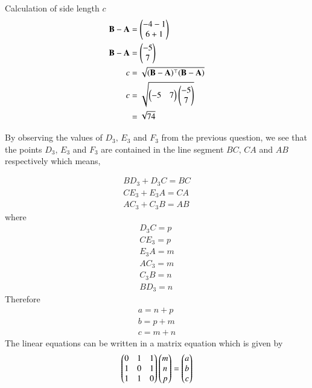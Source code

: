 \documentclass[journal,12pt,twocolumn]{IEEEtran}
\theoremstyle{remark}
\begin{document}
\vspace{0.3cm}
Calculation of side length $c$
\begin{align}
\mathbf{B}-\mathbf{A} &= \begin{pmatrix}-4-1\\6+1\end{pmatrix}\\
\mathbf{B}-\mathbf{A} &= \begin{pmatrix}-5\\7\end{pmatrix}\\
c &= \sqrt{(\mathbf{B}-\mathbf{A})^{\top}(\mathbf{B}-\mathbf{A})}\\
c &= \sqrt{\begin{pmatrix}-5&7\end{pmatrix}\begin{pmatrix}-5\\7\end{pmatrix}}\\
&= \sqrt{74}
\end{align}

\vspace{0.3cm}
By observing the values of $D_3,\, E_3$ and $F_3$ from the previous question, we see that the points $D_3,\, E_3$ and $F_3$ are contained in the line segment $BC, \, CA$ and $AB$ respectively which means,

\begin{align}
BD_3 + D_3C = BC\\
CE_3 + E_3A = CA\\
AC_3 + C_3B = AB
\end{align}
where
\begin{align}
D_3C = p\\
CE_3 = p\\
E_3A = m\\
AC_3 = m\\
C_3B = n\\
BD_3 = n
\end{align}
Therefore
\begin{align}
a = n+p\\
b = p+m\\
c = m+n
\end{align}
The linear equations can be written in a matrix equation which is given by
\begin{align}
\begin{pmatrix}0&1&1\\1&0&1\\1&1&0\end{pmatrix}\begin{pmatrix}m\\n\\p\end{pmatrix} = \begin{pmatrix}a\\b\\c\end{pmatrix}
\end{align}
\end{document}
